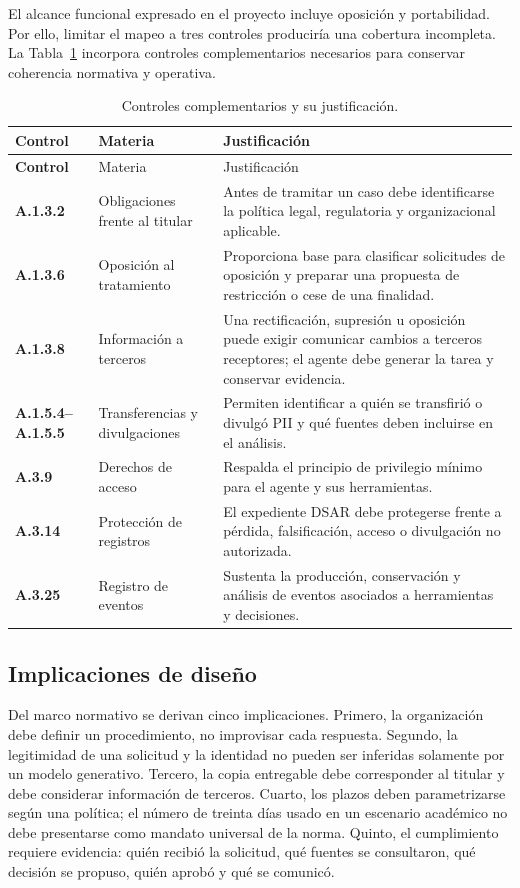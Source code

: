 \documentclass[11pt,a4paper]{article}
\begin{document}
El alcance funcional expresado en el proyecto incluye oposición y portabilidad. Por ello, limitar el mapeo a tres controles produciría una cobertura incompleta. La Tabla~\ref{tab:controls-support} incorpora controles complementarios necesarios para conservar coherencia normativa y operativa.

\begin{longtable}{>{\bfseries}p{2.3cm}p{4cm}p{8.1cm}}
\caption{Controles complementarios y su justificación.}\label{tab:controls-support}\\
\toprule
Control & Materia & Justificación \\
\midrule
\endfirsthead
\toprule
Control & Materia & Justificación \\
\midrule
\endhead
A.1.3.2 & Obligaciones frente al titular & Antes de tramitar un caso debe identificarse la política legal, regulatoria y organizacional aplicable. \\
A.1.3.6 & Oposición al tratamiento & Proporciona base para clasificar solicitudes de oposición y preparar una propuesta de restricción o cese de una finalidad. \\
A.1.3.8 & Información a terceros & Una rectificación, supresión u oposición puede exigir comunicar cambios a terceros receptores; el agente debe generar la tarea y conservar evidencia. \\
A.1.5.4--A.1.5.5 & Transferencias y divulgaciones & Permiten identificar a quién se transfirió o divulgó PII y qué fuentes deben incluirse en el análisis. \\
A.3.9 & Derechos de acceso & Respalda el principio de privilegio mínimo para el agente y sus herramientas. \\
A.3.14 & Protección de registros & El expediente DSAR debe protegerse frente a pérdida, falsificación, acceso o divulgación no autorizada. \\
A.3.25 & Registro de eventos & Sustenta la producción, conservación y análisis de eventos asociados a herramientas y decisiones. \\
\bottomrule
\end{longtable}

\subsection{Implicaciones de diseño}

Del marco normativo se derivan cinco implicaciones. Primero, la organización debe definir un procedimiento, no improvisar cada respuesta. Segundo, la legitimidad de una solicitud y la identidad no pueden ser inferidas solamente por un modelo generativo. Tercero, la copia entregable debe corresponder al titular y debe considerar información de terceros. Cuarto, los plazos deben parametrizarse según una política; el número de treinta días usado en un escenario académico no debe presentarse como mandato universal de la norma. Quinto, el cumplimiento requiere evidencia: quién recibió la solicitud, qué fuentes se consultaron, qué decisión se propuso, quién aprobó y qué se comunicó.
\end{document}

